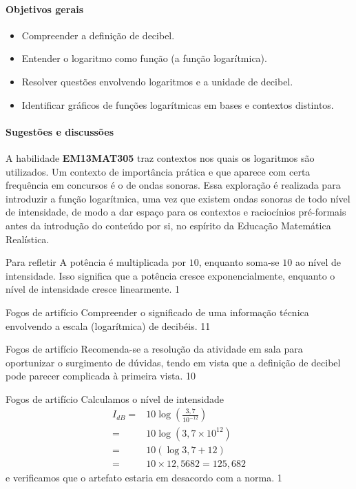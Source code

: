 \clearpage
\def\currentcolor{session1}
\begin{texto}
{
	\paragraph{Objetivos gerais}
	\begin{itemize}
	\item Compreender a definição de decibel.
	\item Entender o logaritmo como função (a função logarítmica).
	\item Resolver questões envolvendo logaritmos e a unidade de decibel.
	\item Identificar gráficos de funções logarítmicas em bases e contextos distintos.
	\end{itemize}

	\paragraph{Sugestões e discussões}
	A habilidade \textbf{EM13MAT305} traz contextos nos quais os logaritmos são utilizados. Um contexto de importância prática e que aparece com certa frequência em concursos é o de ondas sonoras. Essa exploração é realizada para introduzir a função logarítmica, uma vez que existem ondas sonoras de todo nível de intensidade, de modo a dar espaço para os contextos e raciocínios pré-formais antes da introdução do conteúdo por si, no espírito da Educação Matemática Realística.
}
\end{texto}
\marginpar{\vspace{.5em}}
\begin{answer}{Para refletir}
{
	A potência é multiplicada por $10$, enquanto soma-se $10$ ao nível de intensidade. Isso significa que a potência cresce exponencialmente, enquanto o nível de intensidade cresce linearmente.
}{1}
\end{answer}
\clearmargin
\begin{objectives}{Fogos de artifício}
{Compreender o significado de uma informação técnica envolvendo a escala (logarítmica) de decibéis.
}{1}{1}
\end{objectives}
\begin{sugestions}{Fogos de artifício}
{
	Recomenda-se a resolução da atividade em sala para oportunizar o surgimento de dúvidas, tendo em vista que a definição de decibel pode parecer complicada à primeira vista.
}{1}{0}
\end{sugestions}
\begin{answer}{Fogos de artifício}
{
	Calculamos o nível de intensidade
\begin{align*}
	I_{dB} =& 10 \log \left(\frac{3{,}7}{10^{-12}}\right)\\
	=& 10 \log (3{,}7\times 10^{12})\\
	=& 10 (\log 3{,}7+12)\\
	=& 10\times 12{,}5682 = 125{,}682
	\end{align*}
	e verificamos que o artefato estaria em desacordo com a norma.
}{1}
\end{answer}
\def\currentcolor{session4}
\begin{texto}
{
	
}
\end{texto}

